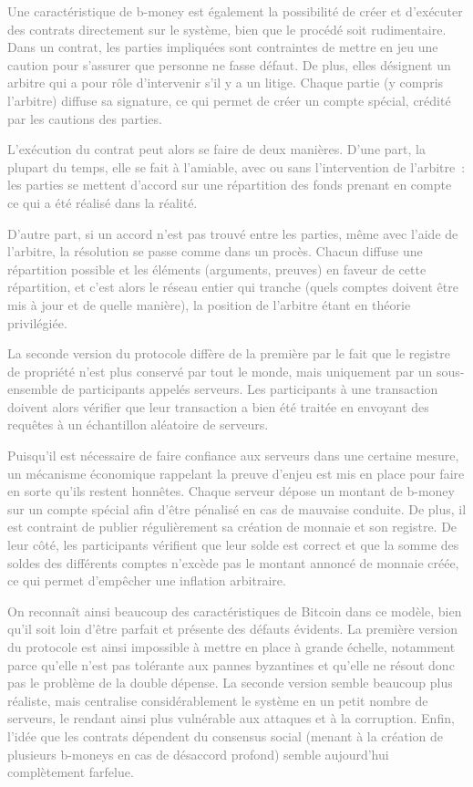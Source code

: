 \textcolor{gray}{Une caractéristique de b-money est également la possibilité de créer et d'exécuter des contrats directement sur le système, bien que le procédé soit rudimentaire. Dans un contrat, les parties impliquées sont contraintes de mettre en jeu une caution pour s'assurer que personne ne fasse défaut. De plus, elles désignent un arbitre qui a pour rôle d'intervenir s'il y a un litige. Chaque partie (y compris l'arbitre) diffuse sa signature, ce qui permet de créer un compte spécial, crédité par les cautions des parties.}

\textcolor{gray}{L'exécution du contrat peut alors se faire de deux manières. D'une part, la plupart du temps, elle se fait à l'amiable, avec ou sans l'intervention de l'arbitre~: les parties se mettent d'accord sur une répartition des fonds prenant en compte ce qui a été réalisé dans la réalité.}

\textcolor{gray}{D'autre part, si un accord n'est pas trouvé entre les parties, même avec l'aide de l'arbitre, la résolution se passe comme dans un procès. Chacun diffuse une répartition possible et les éléments (arguments, preuves) en faveur de cette répartition, et c'est alors le réseau entier qui tranche (quels comptes doivent être mis à jour et de quelle manière), la position de l'arbitre étant en théorie privilégiée.}

\textcolor{gray}{La seconde version du protocole diffère de la première par le fait que le registre de propriété n'est plus conservé par tout le monde, mais uniquement par un sous-ensemble de participants appelés serveurs. Les participants à une transaction doivent alors vérifier que leur transaction a bien été traitée en envoyant des requêtes à un échantillon aléatoire de serveurs.}

\textcolor{gray}{Puisqu'il est nécessaire de faire confiance aux serveurs dans une certaine mesure, un mécanisme économique rappelant la preuve d'enjeu est mis en place pour faire en sorte qu'ils restent honnêtes. Chaque serveur dépose un montant de b-money sur un compte spécial afin d'être pénalisé en cas de mauvaise conduite. De plus, il est contraint de publier régulièrement sa création de monnaie et son registre. De leur côté, les participants vérifient que leur solde est correct et que la somme des soldes des différents comptes n'excède pas le montant annoncé de monnaie créée, ce qui permet d'empêcher une inflation arbitraire.}

\textcolor{gray}{On reconnaît ainsi beaucoup des caractéristiques de Bitcoin dans ce modèle, bien qu'il soit loin d'être parfait et présente des défauts évidents. La première version du protocole est ainsi impossible à mettre en place à grande échelle, notamment parce qu'elle n'est pas tolérante aux pannes byzantines et qu'elle ne résout donc pas le problème de la double dépense. La seconde version semble beaucoup plus réaliste, mais centralise considérablement le système en un petit nombre de serveurs, le rendant ainsi plus vulnérable aux attaques et à la corruption. Enfin, l'idée que les contrats dépendent du consensus social (menant à la création de plusieurs b-moneys en cas de désaccord profond) semble aujourd'hui complètement farfelue.}

